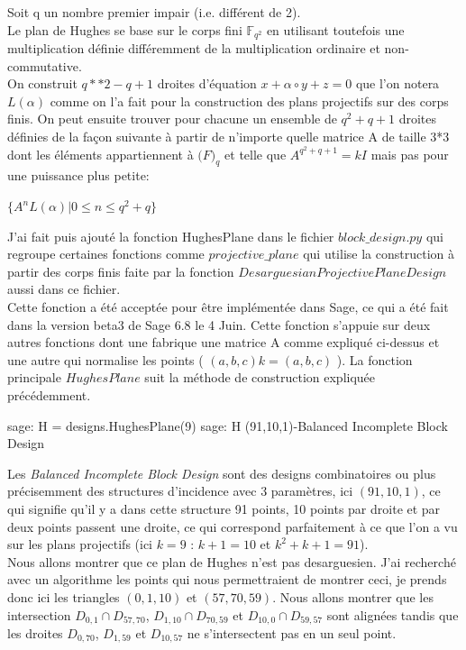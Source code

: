 \documentclass[a4paper]{article}
\begin{document}
Soit q un nombre premier impair (i.e. différent de 2).\\
Le plan de Hughes se base sur le corps fini $\mathbb{F}_{q^2}$ en utilisant toutefois une multiplication définie différemment de la multiplication ordinaire et non-commutative.\\
On construit $q**2-q+1$ droites d'équation $x + \alpha \circ y + z = 0$ que l'on notera $L(\alpha)$ comme on l'a fait pour la construction des plans projectifs sur des corps finis. On peut ensuite trouver pour chacune un ensemble de $q^2 + q + 1$ droites définies de la façon suivante à partir de n'importe quelle matrice A de taille 3*3 dont les éléments appartiennent à $\mathbb(F)_q$ et telle que $A^{q^2+q+1}=kI$ mais pas pour une puissance plus petite:
\begin{center}
 $ \{A^nL(\alpha) | 0 \leq n \leq q^2 + q\}$
\end{center}
\vspace{1\baselineskip}
J'ai fait puis ajouté la fonction HughesPlane dans le fichier $block\_design.py$ qui regroupe certaines fonctions comme $projective\_plane$ qui utilise la construction à partir des corps finis faite par la fonction $DesarguesianProjectivePlaneDesign$ aussi dans ce fichier.\\ Cette fonction a été acceptée pour être implémentée dans Sage, ce qui a été fait dans la version beta3 de Sage 6.8 le 4 Juin.
\newpage
Cette fonction s'appuie sur deux autres fonctions dont une fabrique une matrice A comme expliqué ci-dessus et une autre qui normalise les points ( $(a,b,c)k = (a,b,c)$ ). La fonction principale $HughesPlane$ suit la méthode de construction expliquée précédemment.
\begin{sageverbatim}
 sage: H = designs.HughesPlane(9)
 sage: H
 (91,10,1)-Balanced Incomplete Block Design
\end{sageverbatim}
Les \textit{Balanced Incomplete Block Design} sont des designs combinatoires ou plus précisemment des structures d'incidence avec 3 paramètres, ici $(91, 10, 1)$, ce qui signifie qu'il y a dans cette structure 91 points, 10 points par droite et par deux points passent une droite, ce qui correspond parfaitement à ce que l'on a vu sur les plans projectifs (ici $k=9$ : $k+1=10$ et $k^2+k+1=91$).\\
Nous allons montrer que ce plan de Hughes n'est pas desarguesien. J'ai recherché avec un algorithme les points qui nous permettraient de montrer ceci, je prends donc ici les triangles $(0,1,10)$ et $(57, 70, 59)$. Nous allons montrer que les intersection $D_{0,1} \cap D_{57,70}$, $D_{1,10} \cap D_{70,59}$ et $D_{10,0} \cap D_{59,57}$ sont alignées tandis que les droites $D_{0,70}$, $D_{1,59}$ et $D_{10,57}$ ne s'intersectent pas en un seul point.
\end{document}
